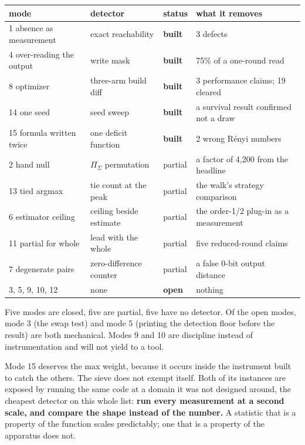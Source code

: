 \begin{center}
\begin{tabular}{@{}llll@{}}
\toprule
mode & detector & status & what it removes \\
\midrule
1 absence as measurement & exact reachability & \textbf{built} & 3 defects \\
4 over-reading the output & write mask & \textbf{built} & 75\% of a one-round read \\
8 optimizer & three-arm build diff & \textbf{built} & 3 performance claims; 19 cleared \\
14 one seed & seed sweep & \textbf{built} & a survival result confirmed not a draw \\
15 formula written twice & one deficit function & \textbf{built} & 2 wrong Rényi numbers \\
2 hand null & \(\Pi_\Sigma\) permutation & partial & a factor of 4,200 from the headline \\
13 tied argmax & tie count at the peak & partial & the walk's strategy comparison \\
6 estimator ceiling & ceiling beside estimate & partial & the order-1/2 plug-in as a measurement \\
11 partial for whole & lead with the whole & partial & five reduced-round claims \\
7 degenerate pairs & zero-difference counter & partial & a false 0-bit output distance \\
3, 5, 9, 10, 12 & none & \textbf{open} & nothing \\
\bottomrule
\end{tabular}
\end{center}

Five modes are closed, five are partial, five have no detector. Of the open modes, mode 3 (the swap test) and mode 5 (printing the detection floor before the result) are both mechanical. Modes 9 and 10 are discipline instead of instrumentation and will not yield to a tool.

Mode 15 deserves the max weight, because it occurs inside the instrument built to catch the others. The sieve does not exempt itself. Both of its instances are exposed by running the same code at a domain it was not designed around, the cheapest detector on this whole list: \textbf{run every measurement at a second scale, and compare the shape instead of the number.} A statistic that is a property of the function scales predictably; one that is a property of the apparatus does not.
